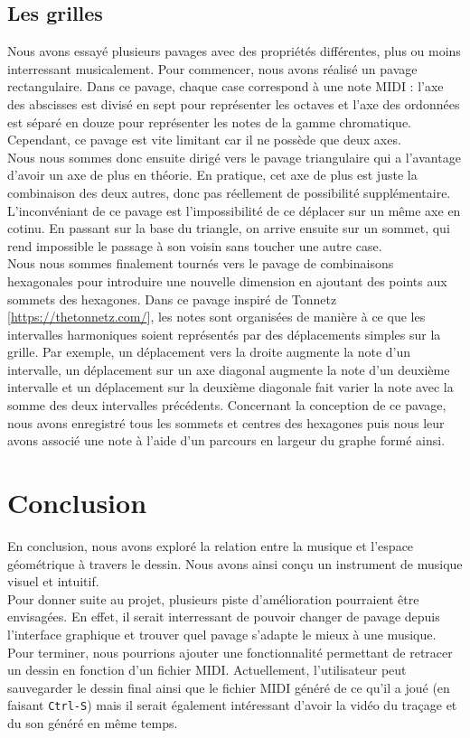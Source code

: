 \documentclass[11pt,a4paper]{article}
\begin{document}
\subsection{Les grilles}
\label{sec:grilles}

Nous avons essayé plusieurs pavages avec des propriétés différentes, plus ou moins interressant musicalement.
Pour commencer, nous avons réalisé un pavage rectangulaire.
Dans ce pavage, chaque case correspond à une note MIDI : l'axe des abscisses est divisé en sept pour représenter les octaves et l'axe des ordonnées est séparé en douze pour représenter les notes de la gamme chromatique.
Cependant, ce pavage est vite limitant car il ne possède que deux axes.\\

Nous nous sommes donc ensuite dirigé vers le pavage triangulaire qui a l'avantage d'avoir un axe de plus en théorie.
En pratique, cet axe de plus est juste la combinaison des deux autres, donc pas réellement de possibilité supplémentaire.
L'inconvéniant de ce pavage est l'impossibilité de ce déplacer sur un même axe en cotinu.
En passant sur la base du triangle, on arrive ensuite sur un sommet, qui rend impossible le passage à son voisin sans toucher une autre case.\\

Nous nous sommes finalement tournés vers le pavage de combinaisons hexagonales pour introduire une nouvelle dimension en ajoutant des points aux sommets des hexagones.
Dans ce pavage inspiré de Tonnetz [\url{https://thetonnetz.com/}], les notes sont organisées de manière à ce que les intervalles harmoniques soient représentés par des déplacements simples sur la grille.
Par exemple, un déplacement vers la droite augmente la note d'un intervalle, un déplacement sur un axe diagonal augmente la note d'un deuxième intervalle et un déplacement sur la deuxième diagonale fait varier la note avec la somme des deux intervalles précédents.
Concernant la conception de ce pavage, nous avons enregistré tous les sommets et centres des hexagones puis nous leur avons associé une note à l'aide d'un parcours en largeur du graphe formé ainsi.

\section{Conclusion}

En conclusion, nous avons exploré la relation entre la musique et l'espace géométrique à travers le dessin.
Nous avons ainsi conçu un instrument de musique visuel et intuitif. \\

Pour donner suite au projet, plusieurs piste d'amélioration pourraient être envisagées.
En effet, il serait interressant de pouvoir changer de pavage depuis l'interface graphique et trouver quel pavage s'adapte le mieux à une musique.
Pour terminer, nous pourrions ajouter une fonctionnalité permettant de retracer un dessin en fonction d'un fichier MIDI. Actuellement, l'utilisateur peut sauvegarder le dessin final ainsi que le fichier MIDI généré de ce qu'il a joué (en faisant \texttt{Ctrl-S}) mais il serait également intéressant d'avoir la vidéo du traçage et du son généré en même temps.\\
\end{document}
